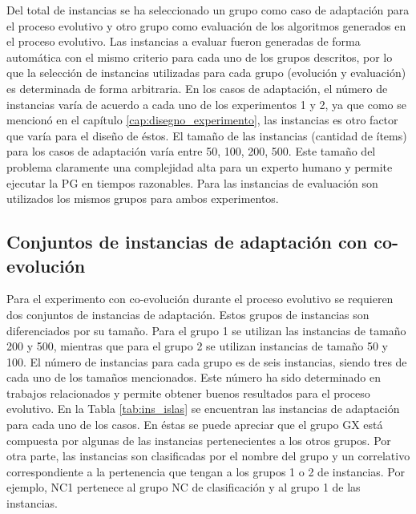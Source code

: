 Del total de instancias se ha seleccionado un grupo como caso de adaptación para el proceso evolutivo y otro grupo como evaluación de los algoritmos generados en el proceso evolutivo. Las instancias a evaluar fueron generadas de forma automática con el mismo criterio para cada uno de los grupos descritos, por lo que la selección de instancias utilizadas para cada grupo (evolución y evaluación) es determinada de forma arbitraria. En los casos de adaptación, el número de instancias varía de acuerdo a cada uno de los experimentos 1 y 2, ya que como se mencionó en el capítulo \ref{cap:disegno_experimento}, las instancias es otro factor que varía para el diseño de éstos. El tamaño de las instancias (cantidad de ítems) para los casos de adaptación varía entre 50, 100, 200, 500. Este tamaño del problema claramente una complejidad alta para un experto humano y permite ejecutar la PG en tiempos razonables. Para las instancias de evaluación son utilizados los mismos grupos para ambos experimentos.


\subsection{Conjuntos de instancias de adaptación con co-evolución}
\label{cap:ins_coev}

Para el experimento con co-evolución durante el proceso evolutivo se requieren dos conjuntos de instancias de adaptación. Estos grupos de instancias son diferenciados por su tamaño. Para el grupo 1 se utilizan las instancias de tamaño 200 y 500, mientras que para el grupo 2 se utilizan instancias de tamaño 50 y 100. El número de instancias para cada grupo es de seis instancias, siendo tres de cada uno de los tamaños mencionados. Este número ha sido determinado en trabajos relacionados \citep{contreras_2013, parada_2015} y permite obtener buenos resultados para el proceso evolutivo. En la Tabla \ref{tab:ins_islas} se encuentran las instancias de adaptación para cada uno de los casos. En éstas se puede apreciar que el grupo GX está compuesta por algunas de las instancias pertenecientes a los otros grupos. Por otra parte, las instancias son clasificadas por el nombre del grupo y un correlativo correspondiente a la pertenencia que tengan a los grupos 1 o 2 de instancias. Por ejemplo, NC1 pertenece al grupo NC de clasificación y al grupo 1 de las instancias.

